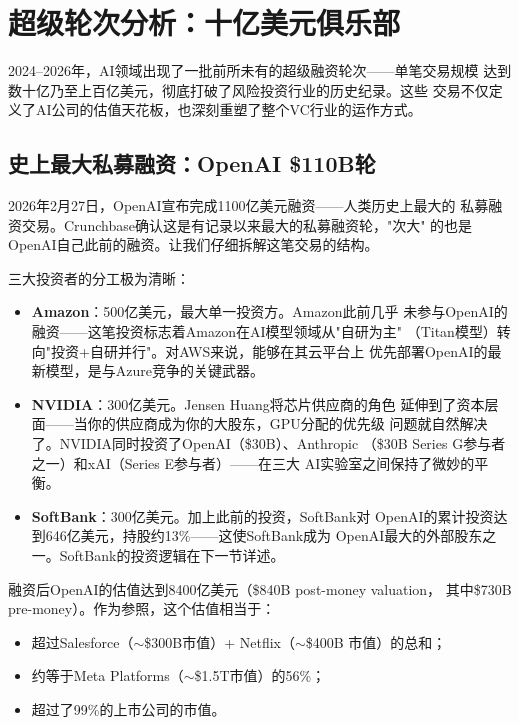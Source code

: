 \section{超级轮次分析：十亿美元俱乐部}
\label{sec:fund-megarounds}

2024--2026年，AI领域出现了一批前所未有的超级融资轮次——单笔交易规模
达到数十亿乃至上百亿美元，彻底打破了风险投资行业的历史纪录。这些
交易不仅定义了AI公司的估值天花板，也深刻重塑了整个VC行业的运作方式。

\subsection{史上最大私募融资：OpenAI \$110B轮}
\label{subsec:fund-openai-mega}

2026年2月27日，OpenAI宣布完成1100亿美元融资——人类历史上最大的
私募融资交易。Crunchbase确认这是有记录以来最大的私募融资轮，"次大"
的也是OpenAI自己此前的融资。让我们仔细拆解这笔交易的结构。

三大投资者的分工极为清晰：

\begin{itemize}
  \item \textbf{Amazon}：500亿美元，最大单一投资方。Amazon此前几乎
    未参与OpenAI的融资——这笔投资标志着Amazon在AI模型领域从"自研为主"
    （Titan模型）转向"投资+自研并行"。对AWS来说，能够在其云平台上
    优先部署OpenAI的最新模型，是与Azure竞争的关键武器。
  \item \textbf{NVIDIA}：300亿美元。Jensen Huang将芯片供应商的角色
    延伸到了资本层面——当你的供应商成为你的大股东，GPU分配的优先级
    问题就自然解决了。NVIDIA同时投资了OpenAI（\$30B）、Anthropic
    （\$30B Series G参与者之一）和xAI（Series E参与者）——在三大
    AI实验室之间保持了微妙的平衡。
  \item \textbf{SoftBank}：300亿美元。加上此前的投资，SoftBank对
    OpenAI的累计投资达到646亿美元，持股约13\%——这使SoftBank成为
    OpenAI最大的外部股东之一。SoftBank的投资逻辑在下一节详述。
\end{itemize}

融资后OpenAI的估值达到8400亿美元（\$840B post-money valuation，
其中\$730B pre-money）。作为参照，这个估值相当于：
\begin{itemize}
  \item 超过Salesforce（$\sim$\$300B市值）+ Netflix（$\sim$\$400B
    市值）的总和；
  \item 约等于Meta Platforms（$\sim$\$1.5T市值）的56\%；
  \item 超过了99\%的上市公司的市值。
\end{itemize}

